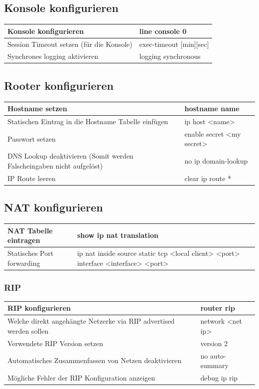 \subsection{Konsole konfigurieren}
\begin{tabu} to \linewidth {|X|X|} 
	\hline
	Konsole konfigurieren & line console 0\\ 
	\hline
	Session Timeout setzen (für die Konsole) &  	exec-timeout [min][sec] \\ 
	\hline
	Synchrones logging aktivieren & logging synchronous \\ 
	\hline
\end{tabu}

\subsection{Rooter konfigurieren}
\begin{tabu} to \linewidth {|X|X|}
	\hline
	Hostname setzen & hostname name\\ 
	\hline
	Statischen Eintrag in die Hostname Tabelle einfügen & ip host <name>\\ 
	\hline
	Passwort setzen & enable secret <my secret> \\ 
	\hline
	DNS Lookup deaktivieren (Somit werden Falscheingaben nicht aufgelöst) & no ip domain-lookup \\ 
	\hline
	IP Route leeren & clear ip route *\\ 
	\hline
\end{tabu}

\subsection{NAT konfigurieren}
\begin{tabu} to \linewidth {|X|X|}
	\hline
	NAT Tabelle eintragen & show ip nat translation \\ 
	\hline
	Statisches Port forwarding & ip nat inside source static tcp <local client> <port> interface <interface> <port> \\ 
	\hline
\end{tabu}

\subsubsection{RIP}
\begin{tabu} to \linewidth {|X|X|}
	\hline
	RIP konfigurieren & router rip \\ 
	\hline
	Welche direkt angehängte Netzerke via RIP advertised werden sollen & network <net ip> \\ 
	\hline
	Verwendete RIP Version setzen & version 2 \\ 
	\hline
	Automatisches Zusammenfassen von Netzen deaktivieren & no auto-summary \\ 
	\hline
	Mögliche Fehler der RIP Konfiguration anzeigen & debug ip rip \\ 
	\hline
\end{tabu}

